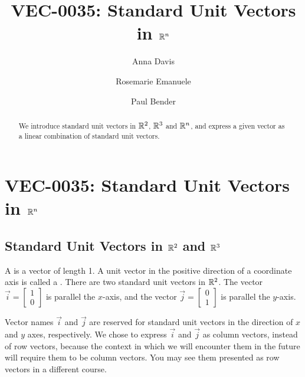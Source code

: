 \documentclass{ximera}
\author{Anna Davis \and Rosemarie Emanuele \and Paul Bender} \title{VEC-0035:  Standard Unit Vectors in $\mathbb{R}^n$} \license{CC-BY 4.0}
\begin{document}
\begin{abstract}
 We introduce standard unit vectors in $\mathbb{R}^2$, $\mathbb{R}^3$ and $\mathbb{R}^n$, and express a given vector as a linear combination of standard unit vectors. 
\end{abstract}
\maketitle

\section*{VEC-0035:  Standard Unit Vectors in $\mathbb{R}^n$}

\subsection*{Standard Unit Vectors in $\mathbb{R}^2$ and $\mathbb{R}^3$} 
A  is a vector of length 1.  A unit vector in the positive direction of a coordinate axis is called a .  There are two standard unit vectors in $\mathbb{R}^2$.  The vector $\vec{i}=\begin{bmatrix}
1\\
0
\end{bmatrix}$ is parallel the $x$-axis, and the vector $\vec{j}=\begin{bmatrix}
0\\
1
\end{bmatrix}$ is parallel the $y$-axis.  

\begin{center}
\end{center}

Vector names $\vec{i}$ and $\vec{j}$ are reserved for standard unit vectors in the direction of $x$ and $y$ axes, respectively.  We chose to express $\vec{i}$ and $\vec{j}$ as column vectors, instead of row vectors, because the context in which we will encounter them in the future will require them to be column vectors.  You may see them presented as row vectors in a different course.
\end{document}
